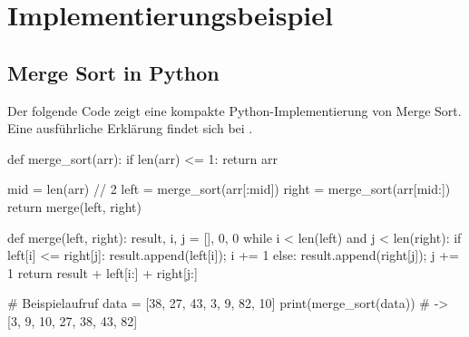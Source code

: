 
\section{Implementierungsbeispiel}

\subsection{Merge Sort in Python}

Der folgende Code zeigt eine kompakte Python-Implementierung von Merge Sort.
Eine ausführliche Erklärung findet sich bei \textcite{wikipedia2024}.

\begin{codebox}
def merge_sort(arr):
    if len(arr) <= 1:
        return arr

    mid   = len(arr) // 2
    left  = merge_sort(arr[:mid])
    right = merge_sort(arr[mid:])
    return merge(left, right)

def merge(left, right):
    result, i, j = [], 0, 0
    while i < len(left) and j < len(right):
        if left[i] <= right[j]:
            result.append(left[i]); i += 1
        else:
            result.append(right[j]); j += 1
    return result + left[i:] + right[j:]

# Beispielaufruf
data = [38, 27, 43, 3, 9, 82, 10]
print(merge_sort(data))   # -> [3, 9, 10, 27, 38, 43, 82]
\end{codebox}

